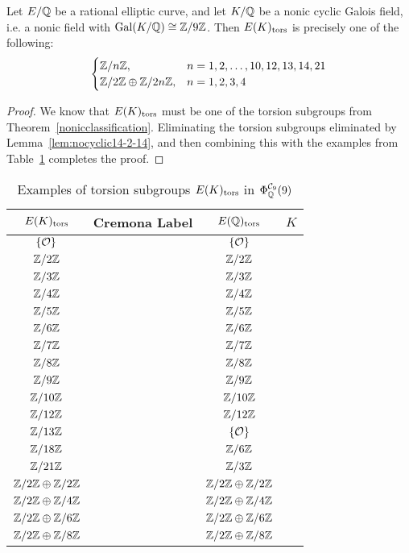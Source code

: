 \begin{thm}
Let $E/\mathbb{Q}$ be a rational elliptic curve, and let $K/\mathbb{Q}$ be a nonic cyclic Galois field, i.e. a nonic field with $\operatorname{Gal}(K/\mathbb{Q}) \cong \mathbb{Z}/9\mathbb{Z}$. Then $E(K)_{\text{tors}}$ is precisely one of the following:
	\[
	\begin{cases}
	\mathbb{Z}/n\mathbb{Z}, & n= 1, 2, \ldots, 10, 12, 13, 14, 21 \\
	\mathbb{Z}/2\mathbb{Z} \oplus \mathbb{Z}/2n\mathbb{Z}, & n= 1, 2, 3, 4
	\end{cases}
	\]
\end{thm}

\begin{proof}
We know that $E(K)_{\text{tors}}$ must be one of the torsion subgroups from Theorem~\ref{nonicclassification}. Eliminating the torsion subgroups eliminated by Lemma~\ref{lem:nocyclic14-2-14}, and then combining this with the examples from Table~\ref{tab:completenoniccyclic} completes the proof. 
\end{proof}


	\begin{table}[!ht] 
	\centering
	\caption{Examples of torsion subgroups $E(K)_{\text{tors}}$ in $\Phi_{\mathbb{Q}}^{\mathcal{C}_9}(9)$\label{tab:completenoniccyclic}}
	\begin{tabular}{cccc} \hline
	 $E(K)_{\text{tors}}$ & Cremona Label & $E(\mathbb{Q})_{\text{tors}}$ & $K$ \\ \hline
	$\{ \mathcal{O} \}$ & \ooat{} & $\{ \mathcal{O} \}$ & \qzetantp{} \\
	$\mathbb{Z}/2\mathbb{Z}$ & \ffafiv{} & $\mathbb{Z}/2\mathbb{Z}$ & \qzetantp{} \\
	$\mathbb{Z}/3\mathbb{Z}$ & \onao{} & $\mathbb{Z}/3\mathbb{Z}$ & \qzetantp{} \\
	$\mathbb{Z}/4\mathbb{Z}$ & \ofas{} & $\mathbb{Z}/4\mathbb{Z}$ & \qzetantp{} \\
	$\mathbb{Z}/5\mathbb{Z}$ & \ooao{} & $\mathbb{Z}/5\mathbb{Z}$ & \qzetantp{} \\
	$\mathbb{Z}/6\mathbb{Z}$ & \ofat{} & $\mathbb{Z}/6\mathbb{Z}$ & \qzetantp{} \\
	$\mathbb{Z}/7\mathbb{Z}$ & \tsbo{} & $\mathbb{Z}/7\mathbb{Z}$ & \qzetantp{} \\
	$\mathbb{Z}/8\mathbb{Z}$ & \ffaf{} & $\mathbb{Z}/8\mathbb{Z}$ & \qzetantp{} \\
	$\mathbb{Z}/9\mathbb{Z}$ & \ffbt{} & $\mathbb{Z}/9\mathbb{Z}$ & \qzetantp{} \\
	$\mathbb{Z}/10\mathbb{Z}$ & \ssco{} & $\mathbb{Z}/10\mathbb{Z}$ & \qzetantp{} \\
	$\mathbb{Z}/12\mathbb{Z}$ & \nzct{} & $\mathbb{Z}/12\mathbb{Z}$ & \qzetantp{} \\
	$\mathbb{Z}/13\mathbb{Z}$ & \ofsbo{} & $\{ \mathcal{O} \}$ & \qzetantp{} \\
	$\mathbb{Z}/18\mathbb{Z}$ & \tszsozot{} & $\mathbb{Z}/6\mathbb{Z}$ & \nnezsb{} \\
	$\mathbb{Z}/21\mathbb{Z}$ & \ostbo{} & $\mathbb{Z}/3\mathbb{Z}$ & \nnstfttf{} \\
	$\mathbb{Z}/2\mathbb{Z} \oplus \mathbb{Z}/2\mathbb{Z}$ & \ffat{} & $\mathbb{Z}/2\mathbb{Z} \oplus \mathbb{Z}/2\mathbb{Z}$ & \qzetantp{} \\
	$\mathbb{Z}/2\mathbb{Z} \oplus \mathbb{Z}/4\mathbb{Z}$ & \ffao{} & $\mathbb{Z}/2\mathbb{Z} \oplus \mathbb{Z}/4\mathbb{Z}$ & \qzetantp{} \\
	$\mathbb{Z}/2\mathbb{Z} \oplus \mathbb{Z}/6\mathbb{Z}$ & \tzat{} & $\mathbb{Z}/2\mathbb{Z} \oplus \mathbb{Z}/6\mathbb{Z}$ & \qzetantp{} \\
	$\mathbb{Z}/2\mathbb{Z} \oplus \mathbb{Z}/8\mathbb{Z}$ & \tozet{} & $\mathbb{Z}/2\mathbb{Z} \oplus \mathbb{Z}/8\mathbb{Z}$ & \qzetantp{} \\
	\end{tabular}
	\end{table}


